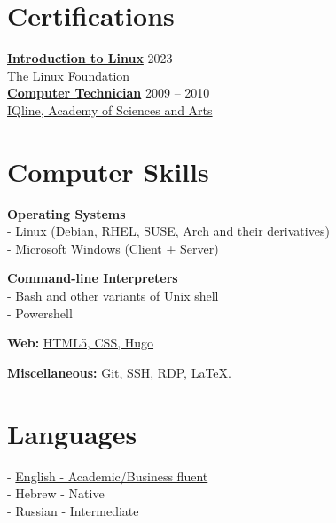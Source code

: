 \documentclass[
	12pt,a4paper %
]{article}
\begin{document}
\begin{paracol}{2} %

\section{Certifications}

\href{https://courses.edx.org/certificates/dc4f0cd758304785a2ea62cca29e6a86}{\textbf{Introduction to Linux}} \hfill 2023 \\
\href{https://courses.edx.org/certificates/dc4f0cd758304785a2ea62cca29e6a86}{The Linux Foundation} \\
\href{https://loona-il.000webhostapp.com/resume-references/computer-technitian-certificate.jpg}{\textbf{Computer Technician}} \hfill 2009 -- 2010 \\
\href{https://loona-il.000webhostapp.com/resume-references/computer-technitian-certificate.jpg}{IQline, Academy of Sciences and Arts}

\section{Computer Skills}

\textbf{Operating Systems} \\
 - Linux (Debian, RHEL, SUSE, Arch and their derivatives)\\
 - Microsoft Windows (Client + Server)

\textbf{Command-line Interpreters} \\
- Bash and other variants of Unix shell \\
- Powershell

\textbf{Web:} \href{https://kiril-u.github.io/resume/}{HTML5, CSS, Hugo}


\textbf{Miscellaneous:} \href{https://github.com/kiril-u}{Git}, SSH, RDP, \LaTeX.

\switchcolumn

\section{Languages}
 - \href{https://loona-il.000webhostapp.com/resume-references/English-Skill.png}{English - Academic/Business fluent} \\
 - Hebrew - Native \\
 - Russian - Intermediate

\end{paracol}
\end{document}
